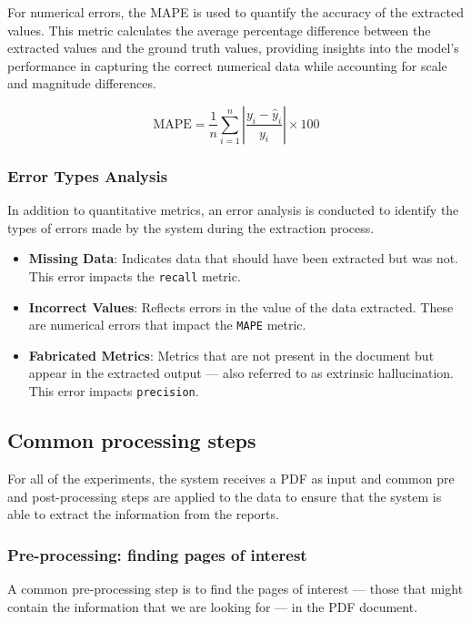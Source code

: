 \documentclass[english, 12pt, a4paper, elec, utf8, a-2b, online]{aaltothesis}
\begin{document}
For numerical errors, the \ac{MAPE} is used to quantify the accuracy of the extracted values.
This metric calculates the average percentage difference between the extracted values and the ground truth values, providing insights into the model's performance in capturing the correct numerical data while accounting for scale and magnitude differences.

\begin{equation}
    \text{MAPE} = \frac{1}{n} \sum_{i=1}^{n} \left| \frac{y_i - \hat{y}_i}{y_i} \right| \times 100
\end{equation}

\subsubsection{Error Types Analysis}

In addition to quantitative metrics, an error analysis is conducted to identify the types of errors made by the system during the extraction process.

\begin{itemize}
    \item \textbf{Missing Data}: Indicates data that should have been extracted but was not. This error impacts the \texttt{recall} metric.
    \item \textbf{Incorrect Values}: Reflects errors in the value of the data extracted. These are numerical errors that impact the \texttt{MAPE} metric.
    \item \textbf{Fabricated Metrics}: Metrics that are not present in the document but appear in the extracted output --- also referred to as extrinsic hallucination. This error impacts \texttt{precision}.
\end{itemize}

\subsection{Common processing steps}

For all of the experiments, the system receives a \ac{PDF} as input and common pre and post-processing steps are applied to the data to ensure that the system is able to extract the information from the reports.

\subsubsection{Pre-processing: finding pages of interest}

A common pre-processing step is to find the pages of interest --- those that might contain the information that we are looking for --- in the \ac{PDF} document.
\end{document}
